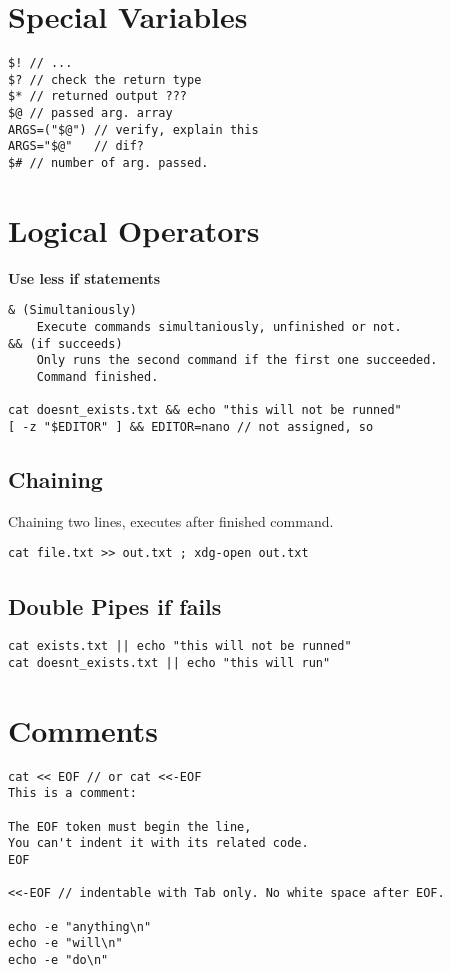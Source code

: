 \section{Special Variables}

\begin{verbatim}
$! // ... 
$? // check the return type
$* // returned output ???
$@ // passed arg. array 
ARGS=("$@") // verify, explain this
ARGS="$@"   // dif?
$# // number of arg. passed.
\end{verbatim}

\section{Logical Operators}

\textbf{Use less if statements}

\begin{verbatim}
& (Simultaniously)
    Execute commands simultaniously, unfinished or not.
&& (if succeeds)
    Only runs the second command if the first one succeeded.
    Command finished.

cat doesnt_exists.txt && echo "this will not be runned" 
[ -z "$EDITOR" ] && EDITOR=nano // not assigned, so
\end{verbatim}

\subsection{Chaining}
Chaining two lines, executes after finished command.

\begin{verbatim}
cat file.txt >> out.txt ; xdg-open out.txt 
\end{verbatim}

\subsection{Double Pipes if fails}

\begin{verbatim}
cat exists.txt || echo "this will not be runned" 
cat doesnt_exists.txt || echo "this will run" 
\end{verbatim}

\section{Comments}

\begin{verbatim}
cat << EOF // or cat <<-EOF
This is a comment:

The EOF token must begin the line,
You can't indent it with its related code. 
EOF

<<-EOF // indentable with Tab only. No white space after EOF.

echo -e "anything\n"
echo -e "will\n"
echo -e "do\n"
\end{verbatim}

